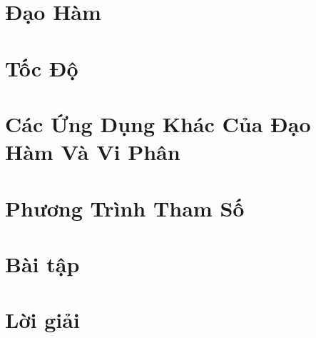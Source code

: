 \section{Đạo Hàm}

\section{Tốc Độ}

\section{Các Ứng Dụng Khác Của Đạo Hàm Và Vi Phân}

\section{Phương Trình Tham Số}

\section{Bài tập}

\section{Lời giải }


\begin{refsection}
\nocite{cack,engineeringHob,danko,calculusjame,demical}
\printbibliography
\end{refsection}


